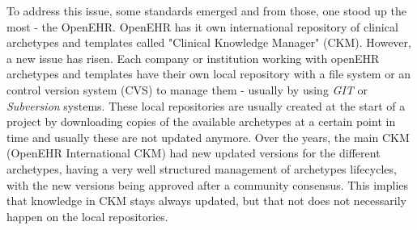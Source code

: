 \documentclass[mim_thesis.tex]{subfiles}
\begin{document}
To address this issue, some standards emerged and from those, one stood up the most - the OpenEHR. OpenEHR has it own international repository of clinical archetypes and templates called "Clinical Knowledge Manager" (CKM). However, a new issue has risen. Each company or institution working with openEHR archetypes and templates have their own local repository with a file system or an control version system (CVS) to manage them - usually by using \textit{GIT} or \textit{Subversion} systems. These local repositories are usually created at the start of a project by downloading copies of the available archetypes at a certain point in time and usually these are not updated anymore. Over the years, the main CKM (OpenEHR International CKM) had new updated versions for the different archetypes, having a very well structured management of archetypes lifecycles, with the new versions being approved after a community consensus. This implies that knowledge in CKM stays always updated, but that not does not necessarily happen on the local repositories. 
\end{document}

